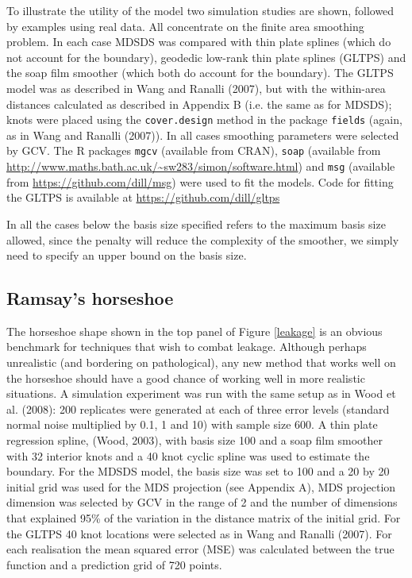 \documentclass[useAMS, referee]{biom}
\begin{document}
To illustrate the utility of the model two simulation studies are shown, followed by examples using real data. All concentrate on the finite area smoothing problem. In each case MDSDS was compared with thin plate splines (which do not account for the boundary), geodedic low-rank thin plate splines (GLTPS) and the soap film smoother (which both do account for the boundary). The GLTPS model was as described in Wang and Ranalli (2007), but with the within-area distances calculated as described in Appendix B (i.e. the same as for MDSDS); knots were placed using the \texttt{cover.design} method in the package \texttt{fields} (again, as in Wang and Ranalli (2007)). In all cases smoothing parameters were selected by GCV. The \textsf{R} packages \texttt{mgcv} (available from CRAN), \texttt{soap} (available from
\url{http://www.maths.bath.ac.uk/~sw283/simon/software.html}) and \texttt{msg} (available from \url{https://github.com/dill/msg}) were used to fit the models. Code for fitting the GLTPS is available at \url{https://github.com/dill/gltps}

In all the cases below the basis size specified refers to the maximum basis size allowed, since the penalty will reduce the complexity of the smoother, we simply need to specify an upper bound on the basis size.


\subsection{Ramsay's horseshoe}

The horseshoe shape shown in the top panel of Figure \ref{leakage} is an obvious benchmark for techniques that wish to combat leakage. Although perhaps unrealistic (and bordering on pathological), any new method that works well on the horseshoe should have a good chance of working well in more realistic situations. A simulation experiment was run with the same setup as in Wood et al. (2008): 200 replicates were generated at each of three error levels (standard normal noise multiplied by 0.1, 1 and 10) with sample size 600. A thin plate regression spline, (Wood, 2003), with basis size 100 and a soap film smoother with 32 interior knots  and a 40 knot cyclic  spline was used to estimate the boundary. For the MDSDS model, the basis size was set to 100 and a 20 by 20 initial grid was used for the MDS projection (see Appendix A), MDS projection dimension was selected by GCV in the range of 2 and the number of dimensions that explained 95\% of the variation in the distance matrix of the initial grid. For the GLTPS 40 knot locations were selected as in Wang and Ranalli (2007). For each realisation the mean squared error (MSE) was calculated between the true function and a prediction grid of 720 points.
\end{document}
